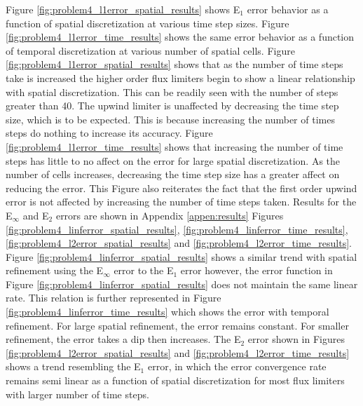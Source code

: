 Figure \ref{fig:problem4_l1error_spatial_results} shows E${}_{1}$ error behavior as a function of spatial discretization at various time step sizes. Figure \ref{fig:problem4_l1error_time_results} shows the same error behavior as a function of temporal discretization at various number of spatial cells. Figure \ref{fig:problem4_l1error_spatial_results} shows that as the number of time steps take is increased the higher order flux limiters begin to show a linear relationship with spatial discretization. This can be readily seen with the number of steps greater than 40. The upwind limiter is unaffected by decreasing the time step size, which is to be expected. This is because increasing the number of times steps do nothing to increase its accuracy. Figure \ref{fig:problem4_l1error_time_results} shows that increasing the number of time steps has little to no affect on the error for large spatial discretization. As the number of cells increases, decreasing the time step size has a greater affect on reducing the error. This Figure also reiterates the fact that the first order upwind error is not affected by increasing the number of time steps taken. Results for the E${}_{\infty}$ and E${}_{2}$ errors are shown in Appendix \ref{appen:results} Figures \ref{fig:problem4_linferror_spatial_results}, \ref{fig:problem4_linferror_time_results}, \ref{fig:problem4_l2error_spatial_results} and \ref{fig:problem4_l2error_time_results}. Figure \ref{fig:problem4_linferror_spatial_results} shows a similar trend with spatial refinement using the E${}_{\infty}$ error to the E${}_{1}$ error however, the error function in Figure \ref{fig:problem4_linferror_spatial_results} does not maintain the same linear rate. This relation is further represented in Figure \ref{fig:problem4_linferror_time_results} which shows the error with temporal refinement. For large spatial refinement, the error remains constant. For smaller refinement, the error takes a dip then increases. The E${}_{2}$ error shown in Figures \ref{fig:problem4_l2error_spatial_results} and \ref{fig:problem4_l2error_time_results} shows a trend resembling the E${}_{1}$ error, in which the error convergence rate remains semi linear as a function of spatial discretization for most flux limiters with larger number of time steps. 

